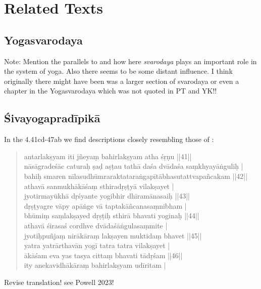 \chapter{Related Texts}

\section{Yogasvarodaya}

Note: Mention the parallels to  and how here \textit{svarodaya} plays an important role in the system of yoga. Also there seems to be some distant influence. I think originally there might have been was a larger section of svarodaya or even a chapter in the Yogasvarodaya which was not quoted in PT and YK!! 

\section{Śivayogapradīpikā}
In the  4.41cd-47ab we find descriptions closely resembling those of :
\begin{quote}
antarlakṣyam iti jñeyaṃ bahirlakṣyam atha śṛṇu ||41||\\
nāsāgradeśāc caturaḥ ṣaḍ aṣṭau tathā daśa dvādaśa saṃkhyayāṅguliḥ |\\
bahiḥ smaren nīlasudhūmraraktataraṅgapītābhasutattvapañcakam ||42||\\
athavā sanmukhākāśaṃ sthiradṛṣṭyā vilakṣayet |\\
jyotirmayūkhā dṛśyante yogibhir dhīramānasaiḥ ||43||\\
dṛṣṭyagre vāpy apāṅge vā taptakāñcanasaṃnibham | \\
bhūmiṃ saṃlakṣayed dṛṣṭiḥ sthirā bhavati yoginaḥ ||44||\\
athavā śirasaś cordhve dvādaśāṅgulasaṃmite |\\
jyotiḥpuñjaṃ nirākāraṃ lakṣayen muktidaṃ bhavet ||45||\\
yatra yatrārthavān yogī tatra tatra vilakṣayet |\\
ākāśam eva yas tasya cittaṃ bhavati tādṛśam ||46||\\
ity anekavidhākāraṃ bahirlakṣyam udīritam |\\
\end{quote}

Revise translation! see Powell 2023! 

